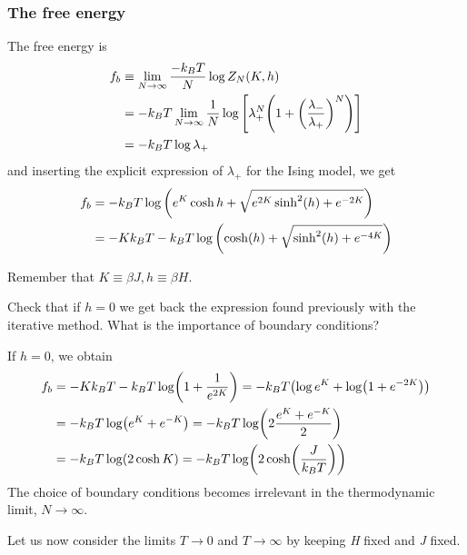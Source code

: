 \documentclass[../main/main.tex]{subfiles}
\begin{document}
\subsubsection{The free energy}
The free energy is
\begin{equation*}
\begin{split}
    f_b & \equiv \lim_{N \rightarrow \infty } \frac{-k_B T}{N} \log{Z_N (K,h)}   \\
    & = -k_B T \lim_{N \rightarrow \infty } \frac{1}{N}  \log{\qty[\lambda _+^N \qty(1+\qty(\frac{\lambda _-}{\lambda _+})^N ) ] } \\
    & = -k_B T \log{\lambda _+}
\end{split}
\end{equation*}
and inserting the explicit expression of \( \lambda _+ \) for the Ising model, we get
\begin{equation}
\begin{split}
f_b  &=  -k_B T \log{ \qty( e^{K} \cosh h + \sqrt{e^{2K} \sinh^2 (h) + e^{-2K}  } ) } \\
& = -K k_B T - k_B T \log{\qty( \cosh(h)+\sqrt{\sinh^2(h)+e^{-4K}  } )}
\end{split}
\end{equation}
\begin{remark}
Remember that \( K \equiv \beta J, h \equiv \beta H\).
\end{remark}
\begin{exercise}{}{}
Check that if \( h=0 \) we get back the expression found previously with the iterative method. What is the importance of boundary conditions?
\begin{solution}
If \(h=0\), we obtain 
\begin{equation*}
\begin{split}
   f_b &= - K k_B T - k_B T \log ( 1 + \frac{1}{e^{2K}})
   = -k_B T \qty( \log e^K  +  \log ( 1 +  e^{-2K}) ) \\ 
   & = -k_B T  \log ( e^K  +  e^{-K} ) =   -k_B T  \log (2 \frac{ e^K  +  e^{-K} }{2} ) \\
   & =  -k_B T  \log (2 \cosh K ) = -k_B T  \log ( 2 \cosh (\frac{J}{k_B T }) )
\end{split}   
\end{equation*}
The choice of boundary conditions becomes irrelevant in the thermodynamic limit, \(N \rightarrow \infty\).
\end{solution}
\end{exercise}
Let us now consider the limits \( T \rightarrow 0 \) and \( T \rightarrow \infty  \) by keeping \emph{H} fixed and \emph{J} fixed.
\end{document}
